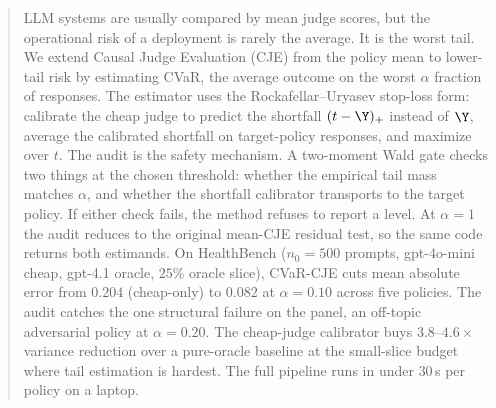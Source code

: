 \begin{abstract}
LLM systems are usually compared by mean judge scores, but the operational
risk of a deployment is rarely the average. It is the worst tail. We
extend Causal Judge Evaluation (CJE) from the policy mean to lower-tail
risk by estimating CVaR, the average outcome on the worst $\alpha$ fraction
of responses. The estimator uses the Rockafellar--Uryasev stop-loss form:
calibrate the cheap judge to predict the shortfall $(t-\Y)_+$ instead of
$\Y$, average the calibrated shortfall on target-policy responses, and
maximize over $t$. The audit is the safety mechanism. A two-moment Wald
gate checks two things at the chosen threshold: whether the empirical tail
mass matches $\alpha$, and whether the shortfall calibrator transports to
the target policy. If either check fails, the method refuses to report a
level. At $\alpha = 1$ the audit reduces to the original mean-CJE residual
test, so the same code returns both estimands.
On HealthBench ($n_0 = 500$ prompts, gpt-4o-mini cheap, gpt-4.1 oracle,
$25\%$ oracle slice), CVaR-CJE cuts mean absolute error from $0.204$
(cheap-only) to $0.082$ at $\alpha = 0.10$ across five policies. The
audit catches the one structural failure on the panel, an off-topic
adversarial policy at $\alpha = 0.20$. The cheap-judge calibrator buys
$3.8$--$4.6\times$ variance reduction over a pure-oracle baseline at the
small-slice budget where tail estimation is hardest. The full pipeline
runs in under $30$\,s per policy on a laptop.
\end{abstract}

